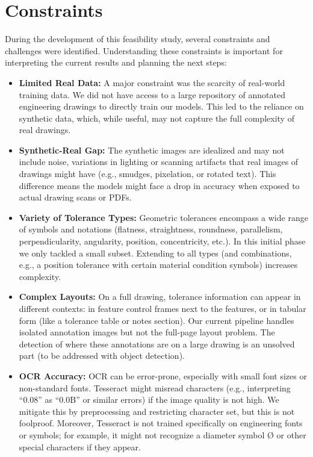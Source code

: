 \documentclass[11pt,a4paper]{article}
\begin{document}
\section{Constraints}
During the development of this feasibility study, several constraints and challenges were identified. Understanding these constraints is important for interpreting the current results and planning the next steps:

\begin{itemize}
  \item \textbf{Limited Real Data:} A major constraint was the scarcity of real-world training data. We did not have access to a large repository of annotated engineering drawings to directly train our models. This led to the reliance on synthetic data, which, while useful, may not capture the full complexity of real drawings.
  \item \textbf{Synthetic-Real Gap:} The synthetic images are idealized and may not include noise, variations in lighting or scanning artifacts that real images of drawings might have (e.g., smudges, pixelation, or rotated text). This difference means the models might face a drop in accuracy when exposed to actual drawing scans or PDFs.
  \item \textbf{Variety of Tolerance Types:} Geometric tolerances encompass a wide range of symbols and notations (flatness, straightness, roundness, parallelism, perpendicularity, angularity, position, concentricity, etc.). In this initial phase we only tackled a small subset. Extending to all types (and combinations, e.g., a position tolerance with certain material condition symbols) increases complexity.
  \item \textbf{Complex Layouts:} On a full drawing, tolerance information can appear in different contexts: in feature control frames next to the features, or in tabular form (like a tolerance table or notes section). Our current pipeline handles isolated annotation images but not the full-page layout problem. The detection of where these annotations are on a large drawing is an unsolved part (to be addressed with object detection).
  \item \textbf{OCR Accuracy:} OCR can be error-prone, especially with small font sizes or non-standard fonts. Tesseract might misread characters (e.g., interpreting “0.08” as “0.0B” or similar errors) if the image quality is not high. We mitigate this by preprocessing and restricting character set, but this is not foolproof. Moreover, Tesseract is not trained specifically on engineering fonts or symbols; for example, it might not recognize a diameter symbol Ø or other special characters if they appear.

\end{itemize}
\end{document}
